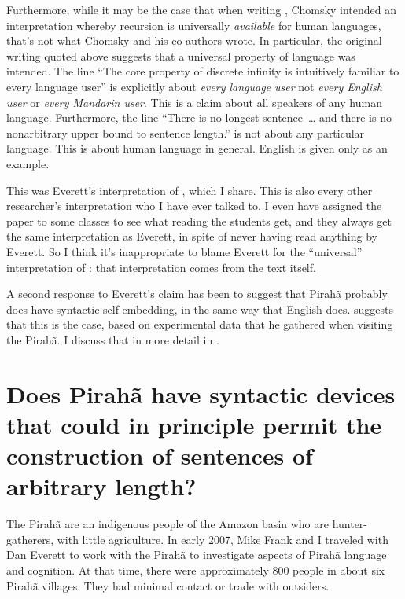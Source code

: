 \documentclass[output=paper]{langscibook}
\begin{document}
Furthermore, while it may be the case that when writing \citet{hauser2002faculty}, Chomsky intended an interpretation whereby recursion is universally \textit{available} for human languages, that's not what Chomsky and his co-authors wrote.
In particular, the original writing quoted above suggests that a universal property of language was intended. The line ``The core property of discrete infinity is intuitively familiar to every language user'' is explicitly about \textit{every language user} not \textit{every English user} or \textit{every Mandarin user}.  This is a claim about all speakers of any human language. Furthermore, the line ``There is no longest sentence~\ldots{} and there is no nonarbitrary upper bound to sentence length.'' is not about any particular language. This is about human language in general. English is given only as an example. 

This was Everett’s interpretation of \citet{hauser2002faculty}, which I share. This is also every other researcher’s interpretation who I have ever talked to. I even have assigned the \citet{hauser2002faculty} paper to some classes to see what reading the students get, and they always get the same interpretation as Everett, in spite of never having read anything by Everett.  So I think it’s inappropriate to blame Everett for the ``universal'' interpretation of \citet{hauser2002faculty}: that interpretation comes from the text itself. 

A second response to Everett’s claim has been to suggest that Pirahã probably does have syntactic self-embedding, in the same way that English does. \citet{sauerland2018false} suggests that this is the case, based on experimental data that he gathered when visiting the Pirahã. I discuss that in more detail in .

\section{Does Pirahã have  syntactic devices that could in principle permit the construction of sentences of arbitrary length?}

The Pirahã are an indigenous people of the Amazon basin who are hunter\hyp gatherers, with little agriculture.  In early 2007, Mike Frank and I traveled with Dan Everett to work with the Pirahã to investigate aspects of Pirahã language and cognition. At that time, there were approximately 800 people in about six Pirahã villages. They had minimal contact or trade with outsiders. 
\end{document}
